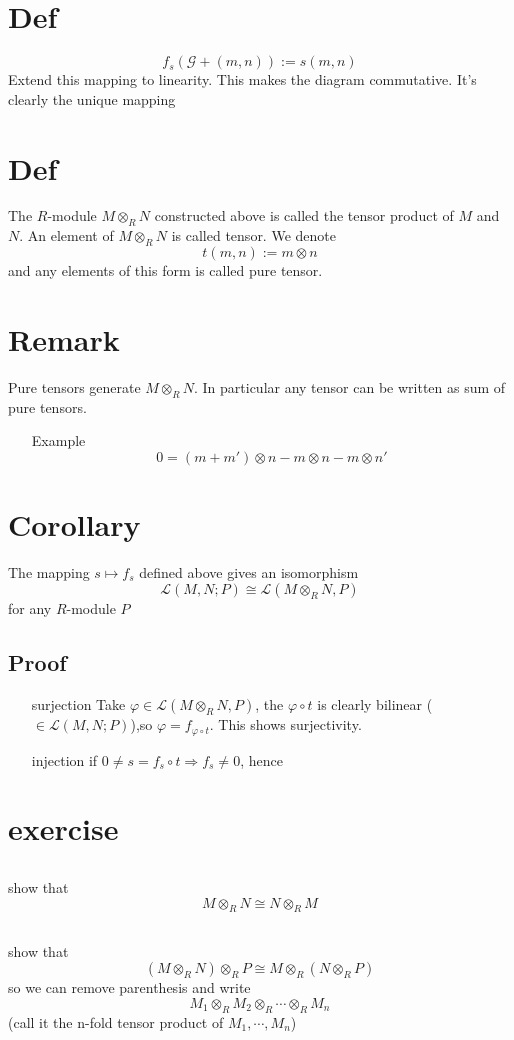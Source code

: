 \documentclass{book}
\begin{document}
\section{Def}
$$f_s(\mathcal{G}+(m,n)):=s(m,n)$$
Extend this mapping to linearity. This makes the diagram commutative. It's clearly the unique mapping
\section{Def}
The $R$-module $M\otimes_RN$ constructed above is called the tensor product of $M$ and $N$. An element of $M\otimes_RN$ is called tensor. We denote$$t(m,n):=m\otimes n$$ and any elements of this form is called pure tensor. 
\section{Remark}Pure tensors generate $M\otimes_R N$. In particular any tensor can be written as sum of pure tensors.
\begin{itemize}
    \item[Example] $$0=(m+m')\otimes n-m\otimes n-m\otimes n'$$
\end{itemize}
\section{Corollary}
The mapping $s\mapsto f_s$ defined above gives an isomorphism
$$\mathscr{L}(M,N;P)\cong \mathscr{L}(M\otimes_RN,P)$$
for any $R$-module $P$
\subsection*{Proof}
\begin{itemize}
    \item[surjection]Take $\varphi\in \mathscr{L}(M\otimes_RN,P)$, the $\varphi\circ t$ is clearly bilinear ($\in\mathscr{L}(M,N;P)$),so $\varphi=f_{\varphi\circ t}$. This shows surjectivity.
    \item[injection]if $0\neq s=f_s\circ t\Rightarrow f_s\neq0$, hence 
\end{itemize}
\section{exercise}
\subsection{}show that $$M\otimes_RN\cong N\otimes_RM$$
\subsection{}show that $$(M\otimes_RN)\otimes_RP\cong M\otimes_R(N\otimes_RP)$$
so we can remove parenthesis and write
$$M_1\otimes_RM_2\otimes_R\cdots\otimes_RM_n$$
(call it the n-fold tensor product of $M_1,\cdots,M_n$)
\end{document}
